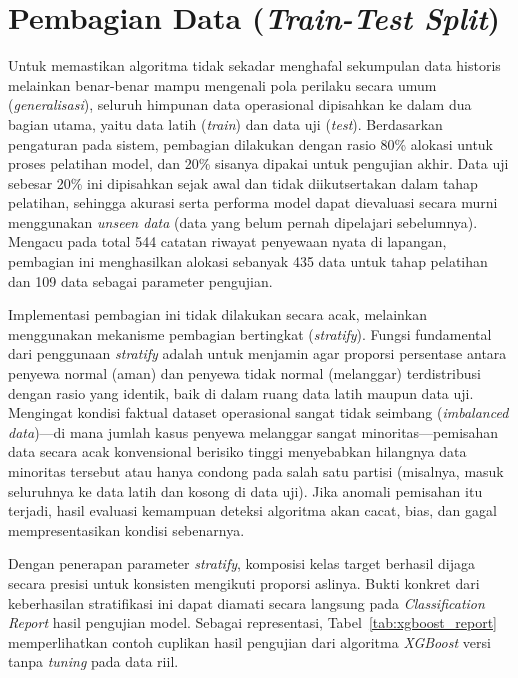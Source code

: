 \section{Pembagian Data (\textit{Train-Test Split})}

Untuk memastikan algoritma tidak sekadar menghafal sekumpulan data historis melainkan benar-benar mampu mengenali pola perilaku secara umum (\textit{generalisasi}), seluruh himpunan data operasional dipisahkan ke dalam dua bagian utama, yaitu data latih (\textit{train}) dan data uji (\textit{test}). Berdasarkan pengaturan pada sistem, pembagian dilakukan dengan rasio 80\% alokasi untuk proses pelatihan model, dan 20\% sisanya dipakai untuk pengujian akhir. Data uji sebesar 20\% ini dipisahkan sejak awal dan tidak diikutsertakan dalam tahap pelatihan, sehingga akurasi serta performa model dapat dievaluasi secara murni menggunakan \textit{unseen data} (data yang belum pernah dipelajari sebelumnya). Mengacu pada total 544 catatan riwayat penyewaan nyata di lapangan, pembagian ini menghasilkan alokasi sebanyak 435 data untuk tahap pelatihan dan 109 data sebagai parameter pengujian.

Implementasi pembagian ini tidak dilakukan secara acak, melainkan menggunakan mekanisme pembagian bertingkat (\textit{stratify}). Fungsi fundamental dari penggunaan \textit{stratify} adalah untuk menjamin agar proporsi persentase antara penyewa normal (aman) dan penyewa tidak normal (melanggar) terdistribusi dengan rasio yang identik, baik di dalam ruang data latih maupun data uji. Mengingat kondisi faktual dataset operasional sangat tidak seimbang (\textit{imbalanced data})—di mana jumlah kasus penyewa melanggar sangat minoritas—pemisahan data secara acak konvensional berisiko tinggi menyebabkan hilangnya data minoritas tersebut atau hanya condong pada salah satu partisi (misalnya, masuk seluruhnya ke data latih dan kosong di data uji). Jika anomali pemisahan itu terjadi, hasil evaluasi kemampuan deteksi algoritma akan cacat, bias, dan gagal mempresentasikan kondisi sebenarnya.

Dengan penerapan parameter \textit{stratify}, komposisi kelas target berhasil dijaga secara presisi untuk konsisten mengikuti proporsi aslinya. Bukti konkret dari keberhasilan stratifikasi ini dapat diamati secara langsung pada \textit{Classification Report} hasil pengujian model. Sebagai representasi, Tabel~\ref{tab:xgboost_report} memperlihatkan contoh cuplikan hasil pengujian dari algoritma \textit{XGBoost} versi tanpa \textit{tuning} pada data riil.

